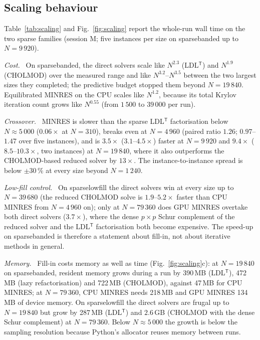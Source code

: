 \documentclass[11pt]{article}
\theoremstyle{definition}
\newcommand{\T}{^{\mathsf T}}
\newcommand{\dsus}{\textunderscore\penalty5000\hskip0pt\relax}
\newcommand{\ds}[1]{{\ttfamily\let\_\dsus#1}}
\newcommand{\lead}[1]{\emph{#1}\ }
\begin{document}
\subsection{Scaling behaviour}\label{sec:scaling}
Table~\ref{tab:scaling} and Fig.~\ref{fig:scaling} report the whole-run wall time on the two sparse families (session M; five instances per size on \ds{sparse\_banded} up to $N=9\,920$).

\lead{Cost.} On \ds{sparse\_banded}, the direct solvers scale like $N^{2.3}$ (LDL$\T$) and $N^{1.9}$ (CHOLMOD) over the measured range and like $N^{3.2}$--$N^{3.5}$ between the two largest sizes they completed; the predictive budget stopped them beyond $N=19\,840$. Equilibrated MINRES on the CPU scales like $N^{1.2}$, because its total Krylov iteration count grows like $N^{0.55}$ (from $1\,500$ to $39\,000$ per run).

\lead{Crossover.} MINRES is slower than the sparse LDL$\T$ factorisation below $N\approx5\,000$ ($0.06\times$ at $N=310$), breaks even at $N=4\,960$ (paired ratio $1.26$; $0.97$--$1.47$ over five instances), and is $3.5\times$ ($3.1$--$4.5\times$) faster at $N=9\,920$ and $9.4\times$ ($8.5$--$10.3\times$, two instances) at $N=19\,840$, where it also outperforms the CHOLMOD-based reduced solver by $13\times$. The instance-to-instance spread is below $\pm30\,\%$ at every size beyond $N=1\,240$.

\lead{Low-fill control.} On \ds{sparse\_lowfill} the direct solvers win at every size up to $N=39\,680$ (the reduced CHOLMOD solve is $1.9$--$5.2\times$ faster than CPU MINRES from $N=4\,960$ on); only at $N=79\,360$ does GPU MINRES overtake both direct solvers ($3.7\times$), where the dense $p\times p$ Schur complement of the reduced solver and the LDL$\T$ factorisation both become expensive. The speed-up on \ds{sparse\_banded} is therefore a statement about fill-in, not about iterative methods in general.

\lead{Memory.} Fill-in costs memory as well as time (Fig.~\ref{fig:scaling}c): at $N=19\,840$ on \ds{sparse\_banded}, resident memory grows during a run by 390\,MB (LDL$\T$), 472\,MB (lazy refactorisation) and 722\,MB (CHOLMOD), against 47\,MB for CPU MINRES; at $N=79\,360$, CPU MINRES needs 218\,MB and GPU MINRES 134\,MB of device memory. On \ds{sparse\_lowfill} the direct solvers are frugal up to $N=19\,840$ but grow by 287\,MB (LDL$\T$) and $2.6$\,GB (CHOLMOD with the dense Schur complement) at $N=79\,360$. Below $N\approx5\,000$ the growth is below the sampling resolution because Python's allocator reuses memory between runs.
\end{document}
